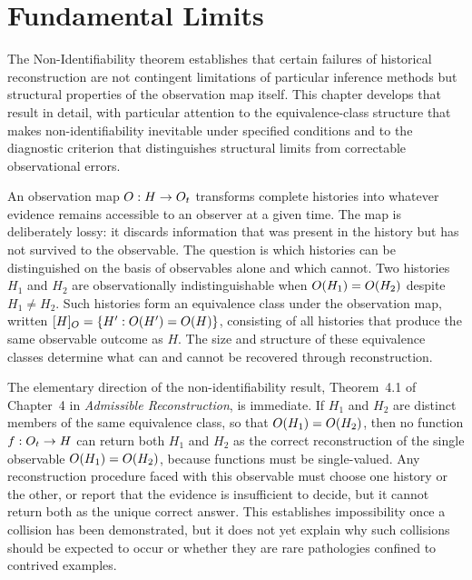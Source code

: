 \chapter{Fundamental Limits}
\label{ch:essay-limits}

The Non-Identifiability theorem establishes that certain failures of historical reconstruction are not contingent limitations of particular inference methods but structural properties of the observation map itself. This chapter develops that result in detail, with particular attention to the equivalence-class structure that makes non-identifiability inevitable under specified conditions and to the diagnostic criterion that distinguishes structural limits from correctable observational errors.

An observation map $O : H \to O_t$ transforms complete histories into whatever evidence remains accessible to an observer at a given time. The map is deliberately lossy: it discards information that was present in the history but has not survived to the observable. The question is which histories can be distinguished on the basis of observables alone and which cannot. Two histories $H_1$ and $H_2$ are observationally indistinguishable when $O(H_1) = O(H_2)$ despite $H_1 \neq H_2$. Such histories form an equivalence class under the observation map, written $[H]_{O} = \{ H' : O(H') = O(H) \}$, consisting of all histories that produce the same observable outcome as $H$. The size and structure of these equivalence classes determine what can and cannot be recovered through reconstruction.

The elementary direction of the non-identifiability result, Theorem~4.1 of Chapter~4 in \emph{Admissible Reconstruction}, is immediate. If $H_1$ and $H_2$ are distinct members of the same equivalence class, so that $O(H_1) = O(H_2)$, then no function $f : O_t \to H$ can return both $H_1$ and $H_2$ as the correct reconstruction of the single observable $O(H_1) = O(H_2)$, because functions must be single-valued. Any reconstruction procedure faced with this observable must choose one history or the other, or report that the evidence is insufficient to decide, but it cannot return both as the unique correct answer. This establishes impossibility once a collision has been demonstrated, but it does not yet explain why such collisions should be expected to occur or whether they are rare pathologies confined to contrived examples.

